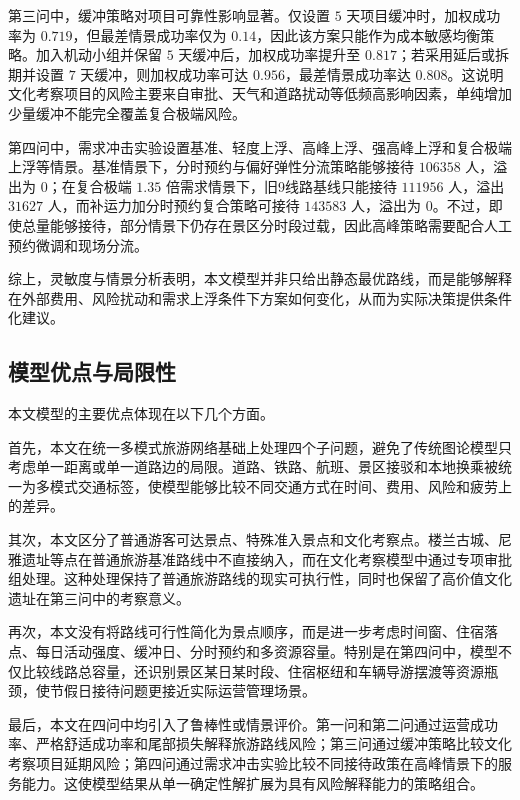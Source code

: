 \documentclass[UTF8,zihao=-4,a4paper]{ctexart}
\begin{document}
第三问中，缓冲策略对项目可靠性影响显著。仅设置 $5$ 天项目缓冲时，加权成功率为 $0.719$，但最差情景成功率仅为 $0.14$，因此该方案只能作为成本敏感均衡策略。加入机动小组并保留 $5$ 天缓冲后，加权成功率提升至 $0.817$；若采用延后或拆期并设置 $7$ 天缓冲，则加权成功率可达 $0.956$，最差情景成功率达 $0.808$。这说明文化考察项目的风险主要来自审批、天气和道路扰动等低频高影响因素，单纯增加少量缓冲不能完全覆盖复合极端风险。

第四问中，需求冲击实验设置基准、轻度上浮、高峰上浮、强高峰上浮和复合极端上浮等情景。基准情景下，分时预约与偏好弹性分流策略能够接待 $106358$ 人，溢出为 $0$；在复合极端 $1.35$ 倍需求情景下，旧9线路基线只能接待 $111956$ 人，溢出 $31627$ 人，而补运力加分时预约复合策略可接待 $143583$ 人，溢出为 $0$。不过，即使总量能够接待，部分情景下仍存在景区分时段过载，因此高峰策略需要配合人工预约微调和现场分流。

综上，灵敏度与情景分析表明，本文模型并非只给出静态最优路线，而是能够解释在外部费用、风险扰动和需求上浮条件下方案如何变化，从而为实际决策提供条件化建议。

\subsection{模型优点与局限性}
\label{subsec:model_advantages_limitations}

本文模型的主要优点体现在以下几个方面。

首先，本文在统一多模式旅游网络基础上处理四个子问题，避免了传统图论模型只考虑单一距离或单一道路边的局限。道路、铁路、航班、景区接驳和本地换乘被统一为多模式交通标签，使模型能够比较不同交通方式在时间、费用、风险和疲劳上的差异。

其次，本文区分了普通游客可达景点、特殊准入景点和文化考察点。楼兰古城、尼雅遗址等点在普通旅游基准路线中不直接纳入，而在文化考察模型中通过专项审批组处理。这种处理保持了普通旅游路线的现实可执行性，同时也保留了高价值文化遗址在第三问中的考察意义。

再次，本文没有将路线可行性简化为景点顺序，而是进一步考虑时间窗、住宿落点、每日活动强度、缓冲日、分时预约和多资源容量。特别是在第四问中，模型不仅比较线路总容量，还识别景区某日某时段、住宿枢纽和车辆导游摆渡等资源瓶颈，使节假日接待问题更接近实际运营管理场景。

最后，本文在四问中均引入了鲁棒性或情景评价。第一问和第二问通过运营成功率、严格舒适成功率和尾部损失解释旅游路线风险；第三问通过缓冲策略比较文化考察项目延期风险；第四问通过需求冲击实验比较不同接待政策在高峰情景下的服务能力。这使模型结果从单一确定性解扩展为具有风险解释能力的策略组合。
\end{document}
